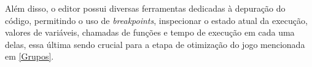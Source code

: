 Além disso, o editor possui diversas ferramentas dedicadas à depuração do código, permitindo o uso de \textit{breakpoints}, inspecionar o estado atual da execução, valores de variáveis, chamadas de funções e tempo de execução em cada uma delas, essa última sendo crucial para a etapa de otimização do jogo mencionada em \ref{Grupos}.
